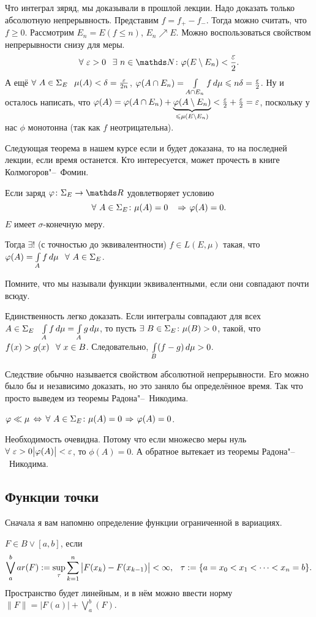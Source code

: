 \begin{Proof}
  Что интеграл зяряд, мы доказывали в прошлой лекции. Надо доказать только абсолютную непрерывность. Представим $f=f_+-f_-$. Тогда можно считать, что $f\ge 0$. Рассмотрим $E_n=E(f\le n)$, $E_n\nearrow E$. Можно воспользоваться свойством непрерывности снизу для меры.
\[
  \forall\ \e>0\pau\exists\ n\in\N\colon \phi(E\dd E_n)<\frac\e2.
\]
А ещё $\forall\ A\in \E_E\pau \mu(A)<\delta = \frac\e{2n}$, $\varphi(A\cap E_n)=\int\limits_{A\cap E_n}f\,d\mu\leqslant n\delta=\frac{\varepsilon}2$.
Ну и осталось написать, что $\phi(A)\hm=\phi(A\cap E_n)+\underbrace{\phi(A\dd E_n)}_{\le\mu(E\dd E_n)}<\frac\e2+\frac\e2=\e$, поскольку у нас $\phi$ монотонна (так как $f$ неотрицательна).
\end{Proof}

Следующая теорема в нашем курсе если и будет доказана, то на последней лекции, если время останется. Кто интересуется, может прочесть в книге Колмогоров"--~Фомин.
\begin{The}
  Если заряд $\phi\colon \E_E\to\R$ удовлетворяет условию
\[
  \forall\ A\in\E_E\colon \mu(A)=0\pau \imp\phi(A)=0.
\]
$E$ имеет $\sigma$-конечную меру.

Тогда $\exists!$ (с точностью до эквивалентности) $f\in L(E,\mu)$ такая, что $\phi(A) = \I Af\pau \forall\ A\in\E_E$.
\end{The}
Помните, что мы называли функции эквивалентными, если они совпадают почти всюду.
\begin{Proof}
 Единственность легко доказать. Если интегралы совпадают для всех $A\in\E_E\pau \I Af=\I Ag$, то пусть $\exists\ B\in\Sigma_E\colon \mu(B)>0$, такой, что $f(x)>g(x)\pau \forall\ x\in B$. Следовательно, $\int\limits_{B}(f-g)\,d\mu>0$.
\end{Proof}

Следствие обычно называется свойством абсолютной непрерывности. Его можно было бы и независимо доказать, но это заняло бы определённое время. Так что просто выведем из теоремы Радона"--~Никодима.
\begin{Sl}
  $\varphi\ll\mu\,\Leftrightarrow\, \forall\ A\in\Sigma_E\colon \mu(A)=0\hspace{1pt plus1pt}\Rightarrow\hspace{1pt plus1pt} \varphi(A)=0$.
\end{Sl}
\begin{Proof}
  Необходимость очевидна. Потому что если множесво меры нуль $\forall\ \varepsilon>0\big|\varphi(A)\big|<\varepsilon$, то $\phi(A)=0$. А обратное вытекает из теоремы Радона"--~Никодима.
\end{Proof}

\subsection{Функции точки}
Сначала я вам напомню определение функции ограниченной в вариациях.
\begin{Def}
  $F\in B\vee[a,b]$, если
\[
  \bigvee\limits_a^bar(F):=\sup\limits_\tau\sum\limits_{k = 1}^{n}\big|F(x_k)-F(x_{k-1})\big|<\infty,\hskip .75em plus.1em minus.08em\relax \tau:=\{a=x_0<x_1<\dots<x_n=b\}.
\]
Пространство будет линейным, и в нём можно ввести норму $\| F\| = \big|F(a)\big|+\bigvee\limits_a^b(F)$.
\end{Def}

